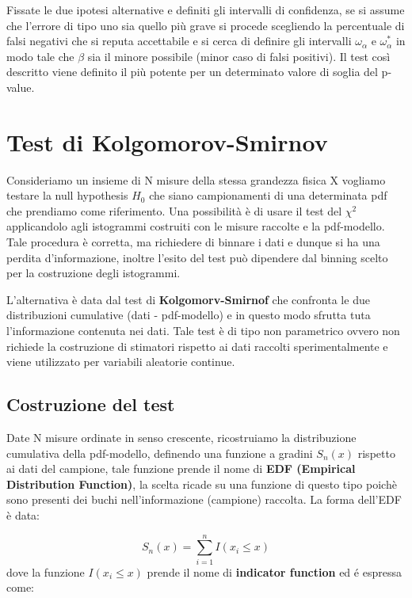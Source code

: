 \documentclass[11pt,a4paper]{book}
\begin{document}
\noindent Fissate le due ipotesi alternative e definiti gli intervalli di confidenza, se si assume che l'errore di tipo uno sia quello pi\`{u} grave si procede scegliendo la percentuale di falsi negativi che si reputa accettabile e si cerca di definire gli intervalli $\omega_\alpha$ e $\omega_\alpha^*$ in modo tale che $\beta$ sia il minore possibile (minor caso di falsi positivi). Il test cos\`{i} descritto viene definito il pi\`{u} potente per un determinato valore di soglia del p-value.

\section{Test di Kolgomorov-Smirnov}

Consideriamo un insieme di N misure della stessa grandezza fisica X vogliamo testare la null hypothesis $H_0$ che siano campionamenti di una determinata pdf che prendiamo come riferimento. Una possibilit\`{a} \`{e} di usare il test del $\chi^2$ applicandolo agli istogrammi costruiti con le misure raccolte e la pdf-modello. Tale procedura \`{e} corretta, ma richiedere di binnare i dati e dunque si ha una perdita d'informazione, inoltre l'esito del test pu\`{o} dipendere dal binning scelto per la costruzione degli istogrammi.

L'alternativa \`{e} data dal test di \textbf{Kolgomorv-Smirnof} che confronta le due distribuzioni cumulative (dati - pdf-modello) e in questo modo sfrutta tuta l'informazione contenuta nei dati. Tale test \`{e} di tipo non parametrico ovvero non richiede la costruzione di stimatori rispetto ai dati raccolti sperimentalmente e viene utilizzato per variabili aleatorie continue. 


\subsection{Costruzione del test}

Date N misure ordinate in senso crescente, ricostruiamo la distribuzione cumulativa della pdf-modello, definendo una funzione a gradini $S_n (x)$ rispetto ai dati del campione, tale funzione prende il nome di \textbf{EDF (Empirical Distribution Function)}, la scelta ricade su una funzione di questo tipo poich\`{e} sono presenti dei buchi nell'informazione (campione) raccolta. La forma dell'EDF \`{e} data:

\begin{equation}
	S_n(x) = \sum_{i=1}^nI(x_i \leq x)  
\end{equation}
dove la funzione $I(x_i \leq x)$ prende il nome di \textbf{indicator function} ed \'{e} espressa come:
\end{document}
